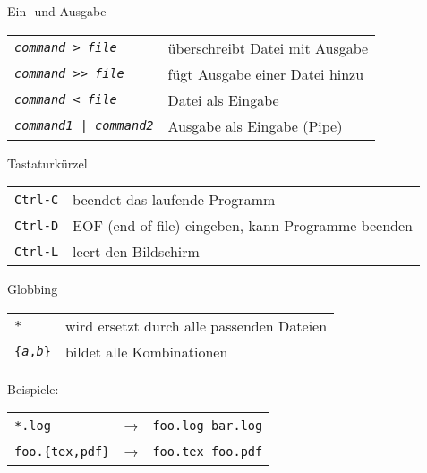 \begin{frame}{Ein- und Ausgabe}
  \begin{tabular}{lp{20em}}
    \texttt{\textit{command} > \textit{file}} & überschreibt Datei mit Ausgabe \\
    \texttt{\textit{command} >> \textit{file}} & fügt Ausgabe einer Datei hinzu \\
    \texttt{\textit{command} < \textit{file}} & Datei als Eingabe \\
    \texttt{\textit{command1} | \textit{command2}} & Ausgabe als Eingabe (Pipe)
  \end{tabular}
\end{frame}

\begin{frame}{Tastaturkürzel}
  \begin{tabular}{lp{20em}}
    \texttt{Ctrl-C} & beendet das laufende Programm \\
    \texttt{Ctrl-D} & EOF (end of file) eingeben, kann Programme beenden \\
    \texttt{Ctrl-L} & leert den Bildschirm
  \end{tabular}
\end{frame}

\begin{frame}{Globbing}
  \begin{tabular}{lp{20em}}
    \texttt{*} & wird ersetzt durch alle passenden Dateien \\
    \texttt{\{\textit{a},\textit{b}\}} & bildet alle Kombinationen
  \end{tabular}

  \vspace{2cm}
  Beispiele:\\
  \begin{tabular}{lcl}
    \texttt{*.log} & → & \texttt{foo.log bar.log} \\
    \texttt{foo.\{tex,pdf\}} & → & \texttt{foo.tex foo.pdf}
  \end{tabular}
\end{frame}
